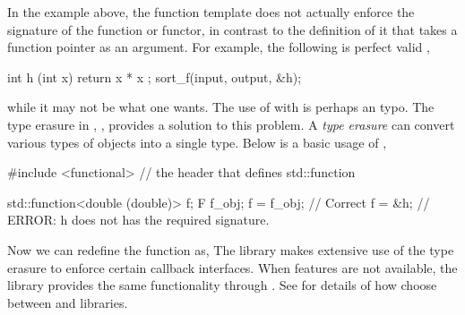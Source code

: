 In the example above, the function template  does not actually enforce the signature of the function or functor, in contrast to the definition of it that takes a function pointer as an argument. For example, the following is perfect valid \cpp,
\begin{cppcode}
int h (int x) { return x * x };
sort_f(input, output, &h);
\end{cppcode}
while it may not be what one wants. The use of  with  is perhaps an typo. The type erasure in \cppoo{}, , provides a solution to this problem. A \emph{type erasure} can convert various types of objects into a single type. Below is a basic usage of ,
\begin{cppcode}
#include <functional> // the header that defines std::function

std::function<double (double)> f;
F f_obj;
f = f_obj;  // Correct
f = &h;     // ERROR: h does not has the required signature.
\end{cppcode}
Now we can redefine the function  as,
The \vsmc library makes extensive use of the type erasure to enforce certain callback interfaces. When \cppoo features are not available, the \boost library provides the same functionality through . See \cite{vsmcjss} for details of how \vsmc choose between \cppoo and \boost libraries.
